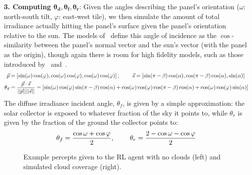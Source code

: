 \documentclass[11pt]{article}
\begin{document}
{\bf 3. Computing $\pmb{\theta_d, \theta_f, \theta_r}$}: Given the angles describing the panel's orientation ($\omega$: north-south tilt, $\varphi$: east-west tile), we then simulate the amount of total irradiance actually hitting the panel's surface given the panel's orientation relative to the sun. The models of~\citet{masters2013renewable} define this angle of incidence as the $\cos$-similarity between the panel's normal vector and the sun's vector (with the panel as the origin), though again there is room for high fidelity models, such as those introduced by~\citet{andersen1980comments} and~\citet{klein1977calculation}.
\begin{align*}
\vec{p} &= \left[ \sin(\omega)  \cos(\varphi), \cos(\omega)  \cos(\varphi), \cos(\omega) \cos(\varphi) \right], \hspace{8mm} \vec{s} = \left[ \sin(\pi - \beta)  \cos(\alpha), \cos(\pi - \beta)  \cos(\alpha), \sin(\alpha) \right] \\
\theta_d &= \frac{\vec{p} \cdot \vec{s}}{||\vec{p}|| ||\vec{s} ||} = \left[ \sin(\omega)  \cos(\varphi)  \sin(\pi - \beta)  \cos(\alpha) + \cos(\omega)  \cos(\varphi)  \cos(\pi - \beta)  \cos(\alpha) +  \cos(\omega) \cos(\varphi)  \sin(\alpha)  \right]
\end{align*}
The diffuse irradiance incident angle, $\theta_f$, is given by a simple approximation: the solar collector is exposed to whatever fraction of the sky it points to, while $\theta_r$ is given by the fraction of the ground the collector points to:
\begin{equation}
\theta_f = \frac{\cos \omega + \cos \varphi}{2}, \hspace{8mm} \theta_r = \frac{2 - \cos\omega - \cos \varphi}{2}
\end{equation}
\begin{figure}[t]
\begin{center}
 \hspace{16mm} %
\caption{Example percepts given to the RL agent with no clouds (left) and simulated cloud coverage (right).}
\end{center}
\end{figure}
\end{document}
